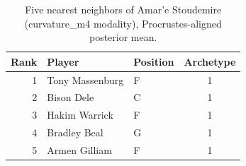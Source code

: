 \begin{table}[htbp]
  \centering\small
  \begin{tabular}{rllc}
    \toprule
    Rank & Player & Position & Archetype \\
    \midrule
    1 & Tony Massenburg & F & 1 \\
    2 & Bison Dele & C & 1 \\
    3 & Hakim Warrick & F & 1 \\
    4 & Bradley Beal & G & 1 \\
    5 & Armen Gilliam & F & 1 \\
    \bottomrule
  \end{tabular}
  \caption{Five nearest neighbors of Amar'e Stoudemire (curvature_m4 modality), Procrustes-aligned posterior mean.}
  \label{tab:Amar_e_Stoudemire_neighbors_curvature_m4}
\end{table}

